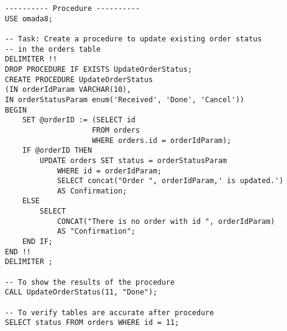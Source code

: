 \begin{lstlisting}
---------- Procedure ----------
USE omada8;

-- Task: Create a procedure to update existing order status 
-- in the orders table
DELIMITER !!
DROP PROCEDURE IF EXISTS UpdateOrderStatus;
CREATE PROCEDURE UpdateOrderStatus 
(IN orderIdParam VARCHAR(10), 
IN orderStatusParam enum('Received', 'Done', 'Cancel'))
BEGIN
    SET @orderID := (SELECT id 
                    FROM orders 
                    WHERE orders.id = orderIdParam);
    IF @orderID THEN
	    UPDATE orders SET status = orderStatusParam 
            WHERE id = orderIdParam;
            SELECT concat("Order ", orderIdParam,' is updated.')    
            AS Confirmation;
    ELSE 
	    SELECT 
            CONCAT("There is no order with id ", orderIdParam) 
            AS "Confirmation";
    END IF;
END !!
DELIMITER ;

-- To show the results of the procedure
CALL UpdateOrderStatus(11, "Done");

-- To verify tables are accurate after procedure
SELECT status FROM orders WHERE id = 11;
\end{lstlisting}
